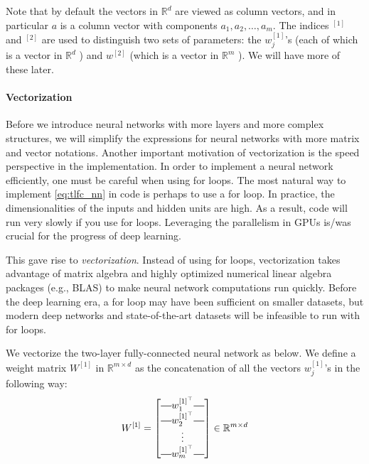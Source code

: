 Note that by default the vectors in $\mathbb R^d$ are viewed as column vectors, and
in particular $a$ is a column vector with components $a_1 ,a_2 ,\ldots,a_m$. The indices
${}^{[1]}$ and ${}^{[2]}$ are used to distinguish two sets of parameters: the $w^{[1]}_j$'s (each of
which is a vector in $\mathbb R^d$ ) and $w^{[2]}$ (which is a vector in $\mathbb R^m$ ). We will have
more of these later.

\paragraph{Vectorization} Before we introduce neural networks with more layers and
more complex structures, we will simplify the expressions for neural networks
with more matrix and vector notations. Another important motivation of
vectorization is the speed perspective in the implementation. In order to
implement a neural network efficiently, one must be careful when using for
loops. The most natural way to implement \cref{eq:tlfc_nn} in code is perhaps
to use a for loop. In practice, the dimensionalities of the inputs and hidden
units are high. As a result, code will run very slowly if you use for loops.
Leveraging the parallelism in GPUs is/was crucial for the progress of deep
learning.

This gave rise to \textit{vectorization}. Instead of using for loops, vectorization
takes advantage of matrix algebra and highly optimized numerical linear
algebra packages (e.g., BLAS) to make neural network computations run
quickly. Before the deep learning era, a for loop may have been sufficient
on smaller datasets, but modern deep networks and state-of-the-art datasets
will be infeasible to run with for loops.

We vectorize the two-layer fully-connected neural network as below. We
define a weight matrix $W^{[1]}$ in $\mathbb R^{m \times d}$ as the concatenation of all the vectors
$w^{[1]}_j$'s in the following way:
\begin{equation*}
    W^{[1]} = \begin{bmatrix}
        \horzbar w^{[1]^\top}_1 \horzbar\\
        \horzbar w^{[1]^\top}_2 \horzbar\\
        \vdots\\
        \horzbar w^{[1]^\top}_m \horzbar
    \end{bmatrix} \in \mathbb{R}^{m \times d}
\end{equation*}

